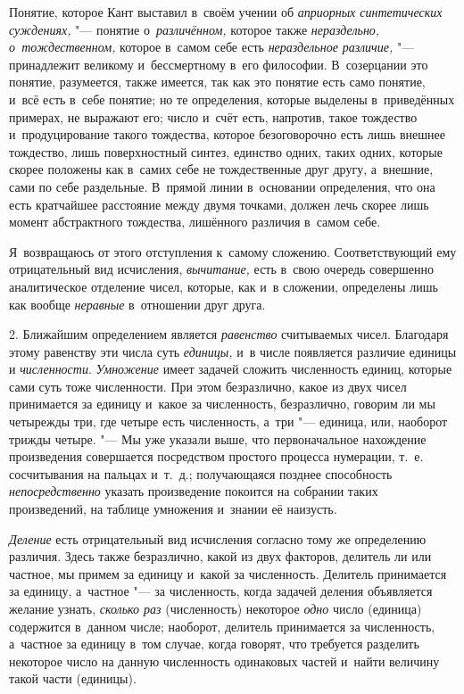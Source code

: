Понятие, которое Кант выставил в~своём учении об
{\em априорных синтетических суждениях,} "--- понятие о~{\em различённом,}
которое также {\em нераздельно, о~тождественном,} которое в~самом себе есть
{\em нераздельное различие,} "--- принадлежит великому и~бессмертному в~его
философии. В~созерцании это понятие, разумеется, также имеется, так как это
понятие есть само понятие, и~всё есть в~себе понятие; но те определения,
которые выделены в~приведённых примерах, не выражают его; число и~счёт
есть, напротив, такое тождество и~продуцирование такого тождества, которое
безоговорочно есть лишь внешнее тождество, лишь поверхностный синтез, единство
одних, таких одних, которые скорее положены как в~самих себе не
тождественные друг другу, а~внешние, сами по себе раздельные. В~прямой линии
в~основании определения, что она есть кратчайшее расстояние между двумя
точками, должен лечь скорее лишь момент абстрактного тождества, лишённого
различия в~самом себе.

Я~возвращаюсь от этого отступления к~самому сложению. Соответствующий ему
отрицательный вид исчисления, {\em вычитание,} есть в~свою очередь совершенно
аналитическое отделение чисел, которые, как и~в сложении, определены лишь как
вообще {\em неравные} в~отношении друг друга.

2. Ближайшим определением является {\em равенство} считываемых
чисел. Благодаря этому равенству эти числа
суть {\em единицы,} и~в числе появляется различие единицы и {\em численности}.
{\em Умножение} имеет задачей сложить численность единиц,
которые сами суть тоже численности. При этом безразлично, какое из двух чисел
принимается за единицу и~какое за численность, безразлично, говорим ли мы
четырежды три, где четыре есть численность, а~три "--- единица, или, наоборот
трижды четыре. "--- Мы уже указали выше, что первоначальное нахождение
произведения совершается посредством простого процесса нумерации, т.~е.
сосчитывания на пальцах и~т.~д.; получающаяся позднее способность
{\em непосредственно} указать произведение покоится на собрании таких
произведений, на таблице умножения и~знании её наизусть.

{\em Деление} есть отрицательный вид исчисления согласно тому же определению
различия. Здесь также безразлично, какой из двух факторов, делитель ли или
частное, мы примем за единицу и~какой за численность. Делитель принимается за
единицу, а~частное "--- за численность, когда задачей деления объявляется
желание узнать, {\em сколько раз} (численность) некоторое {\em одно} число
(единица) содержится в~данном числе; наоборот, делитель принимается за
численность, а~частное за единицу в~том случае, когда говорят, что требуется
разделить некоторое число на данную численность одинаковых частей и~найти
величину такой части (единицы).

